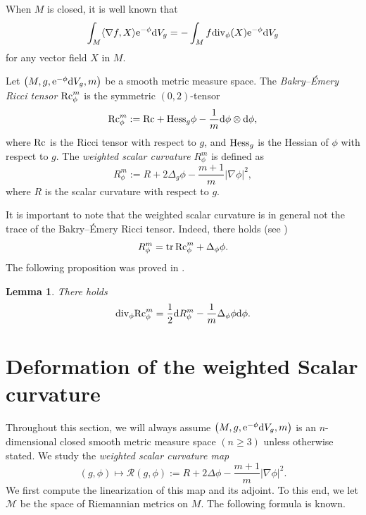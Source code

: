 \documentclass[10pt,a4paper]{amsart}
\numberwithin{equation}{section}
\newtheorem{Lemma}[Theorem]{Lemma}
\begin{document}
When $M$ is closed, it is well known that
\begin{equation}
\int_M \langle \nabla f,X\rangle {\rm e}^{-\phi}{\rm d}V_g=-\int_M f {\rm div}_\phi(X){\rm e}^{-\phi}{\rm d}V_g \label{IBP}
\end{equation}
for any vector field $X$ in $M$.

\begin{Definition}
 Let $\bigl(M,g,{\rm e}^{-\phi}{\rm d}V_g,m\bigr)$ be a smooth metric measure space. The \textit{Bakry--\'{E}mery Ricci tensor} ${\rm Rc}_\phi^m$ is the symmetric $(0,2)$-tensor
 \begin{equation*}
 {\rm Rc}_\phi^m:={\rm Rc}+{\rm Hess}_g\phi-\frac{1}{m} {\rm d}\phi\otimes {\rm d}\phi,
 \end{equation*}
 where ${\rm Rc}$ is the Ricci tensor with respect to $g$, and ${\rm Hess}_g$ is the Hessian of $\phi$ with respect to $g$.
 The \textit{weighted scalar curvature} $R_\phi^m$ is defined as
 \begin{equation*}
 R_\phi^m:=R+2\Delta_g\phi-\frac{m+1}{m} |\nabla \phi |^2,
 \end{equation*}
 where $R$ is the scalar curvature with respect to $g$.
\end{Definition}
It is important to note that the weighted scalar curvature is in general not the trace of the Bakry--\'{E}mery Ricci tensor. Indeed,
there holds (see \cite[formula~(4.1)]{Case4})
\begin{equation*}%
 R_\phi^m=\operatorname{tr}{\rm Rc}_\phi^m+\Delta_\phi\phi.
\end{equation*}
The following proposition was proved in \cite[Proposition 4.2]{Case4}.

\begin{Lemma}\label{bianchi}
There holds
 \begin{equation*}%
 {\rm div}_\phi {\rm Rc}_\phi^m=\frac{1}{2}{\rm d}R_\phi^m-\frac{1}{m}\Delta_\phi\phi {\rm d}\phi.
 \end{equation*}
\end{Lemma}

\section{Deformation of the weighted Scalar curvature}\label{sec3}

Throughout this section, we will always assume $\bigl(M,g,{\rm e}^{-\phi}{\rm d}V_g,m\bigr)$ is an $n$-dimensional closed smooth metric measure space $(n\geq3)$ unless otherwise stated.
We study the \textit{weighted scalar curvature map}
\[(g,\phi)\mapsto \mathcal{R}(g,\phi):=R+2\Delta \phi -\frac{m+1}{m} |\nabla \phi |^2.\]
We first compute the linearization of this map and its adjoint.
To this end, we let $\mathcal{M}$ be the space of Riemannian metrics on $M$.
The following formula is known.
\end{document}
